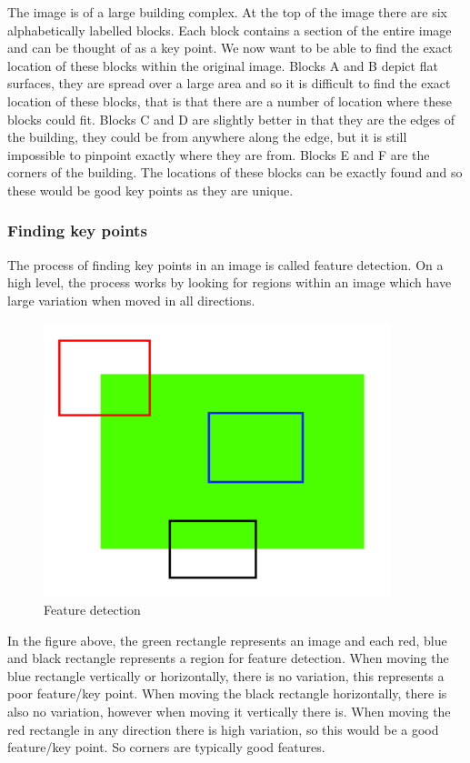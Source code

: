 \documentclass[11pt,a4paper]{report}
\begin{document}
				The image is of a large building complex. At the top of the image there are six alphabetically labelled blocks. Each block contains a section of the entire image and can be thought of as a key point. We now want to be able to find the exact location of these blocks within the original image. 
				Blocks A and B depict flat surfaces, they are spread over a large area and so it is difficult to find the exact location of these blocks, that is that there are a number of location where these blocks could fit.
				Blocks C and D are slightly better in that they are the edges of the building, they could be from anywhere along the edge, but it is still impossible to pinpoint exactly where they are from.
				Blocks E and F are the corners of the building. The locations of these blocks can be exactly found and so these would be good key points as they are unique.
			
			\subsubsection{Finding key points}
				The process of finding key points in an image is called feature detection. On a high level, the process works by looking for regions within an image which have large variation when moved in all directions.
				
				\begin{figure}[H]
					\centering
					\includegraphics[width=0.9\textwidth]{feature_detection}
					\caption{Feature detection}
				\end{figure}
				
				In the figure above, the green rectangle represents an image and each red, blue and black rectangle represents a region for feature detection. When moving the blue rectangle vertically or horizontally, there is no variation, this represents a poor feature/key point. When moving the black rectangle horizontally, there is also no variation, however when moving it vertically there is. When moving the red rectangle in any direction there is high variation, so this would be a good feature/key point. So corners are typically good features.
				
\end{document}
